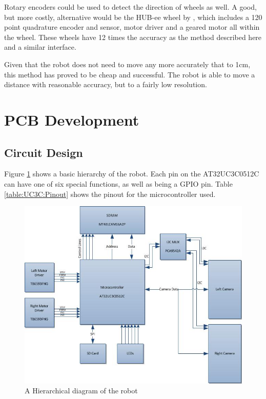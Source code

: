 Rotary encoders could be used to detect the direction of wheels as well. A good, but more costly, alternative would be the HUB-ee wheel by \cite{Creative_Robotics}, which includes a 120 point quadrature encoder and sensor, motor driver and a geared motor all within the wheel. These wheels have 12 times the accuracy as the method described here and a similar interface. 
 
Given that the robot does not need to move any more accurately that to 1cm, this method has proved to be cheap and successful. The robot is able to move a distance with reasonable accuracy, but to a fairly low resolution.

\section{PCB Development}\label{Section:PCB_Dev}
\subsection{Circuit Design}

Figure \ref{fig:Hierarchical} shows a basic hierarchy of the robot. Each pin on the AT32UC3C0512C can have one of six special functions, as well as being a GPIO pin.  Table \ref{table:UC3C:Pinout} shows the pinout for the microcontroller used. 
\begin{figure}
\includegraphics[width=\textwidth]{Figures/hierarchy.jpg}
\caption{A Hierarchical diagram of the robot}
\label{fig:Hierarchical}
\end{figure}

